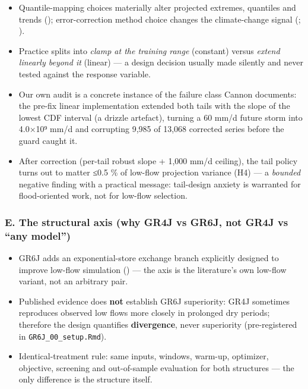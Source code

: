\documentclass[
  english,
  11pt,
]{article}
\providecommand{\tightlist}{%
  \setlength{\itemsep}{0pt}\setlength{\parskip}{0pt}}
\begin{document}
\begin{itemize}
\tightlist
\item
  Quantile-mapping choices materially alter projected extremes,
  quantiles and trends (); error-correction method choice changes the climate-change
  signal (;
  ).
\item
  Practice splits into \emph{clamp at the training range} (constant)
  versus \emph{extend linearly beyond it} (linear) --- a design decision
  usually made silently and never tested against the response variable.
\item
  Our own audit is a concrete instance of the failure class Cannon
  documents: the pre-fix linear implementation extended both tails with
  the slope of the lowest CDF interval (a drizzle artefact), turning a
  60 mm/d future storm into 4.0×10⁹ mm/d and corrupting 9,985 of 13,068
  corrected series before the guard caught it.
\item
  After correction (per-tail robust slope + 1,000 mm/d ceiling), the
  tail policy turns out to matter ≤0.5 \% of low-flow projection
  variance (H4) --- a \emph{bounded} negative finding with a practical
  message: tail-design anxiety is warranted for flood-oriented work, not
  for low-flow selection.
\end{itemize}

\subsubsection{E. The structural axis (why GR4J vs GR6J, not GR4J vs
``any
model'')}\label{e.-the-structural-axis-why-gr4j-vs-gr6j-not-gr4j-vs-any-model}

\begin{itemize}
\tightlist
\item
  GR6J adds an exponential-store exchange branch explicitly designed to
  improve low-flow simulation
  () --- the
  axis is the literature's own low-flow variant, not an arbitrary pair.
\item
  Published evidence does \textbf{not} establish GR6J superiority: GR4J
  sometimes reproduces observed low flows more closely in prolonged dry
  periods; therefore the design quantifies \textbf{divergence}, never
  superiority (pre-registered in \texttt{GR6J\_00\_setup.Rmd}).
\item
  Identical-treatment rule: same inputs, windows, warm-up, optimizer,
  objective, screening and out-of-sample evaluation for both structures
  --- the only difference is the structure itself.
\end{itemize}
\end{document}
